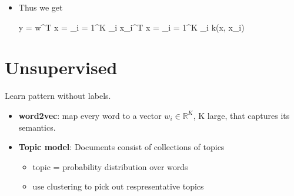 \begin{itemize}
	\item Thus we get
	\begin{myalign*}
	    \*y = \*w^T \*x = \sum_{i = 1}^K \alpha_i \*x_i^T \*x = \sum_{i = 1}^K \alpha_i k(\*x, \*x_i) 
	\end{myalign*}
\end{itemize}


\section{Unsupervised}
 Learn pattern without labels.
\begin{itemize}
	\item \textbf{word2vec}: map every word to a vector $w_i \in \mathbb{R}^K$, K large, that captures its semantics.
	\item \textbf{Topic model}: Documents consist of collections of topics
		\begin{itemize}
			\item topic = probability distribution over words
			\item use clustering to pick out respresentative topics
		\end{itemize}
\end{itemize}

